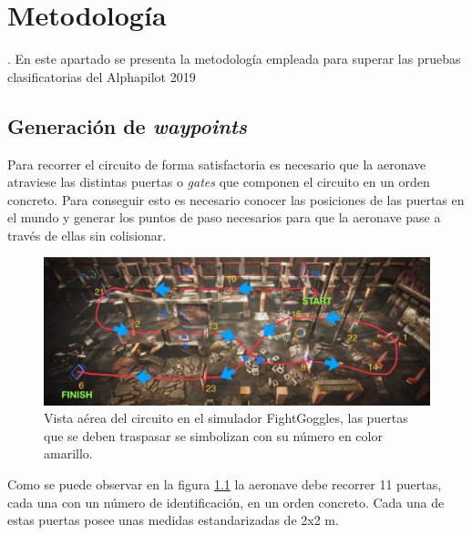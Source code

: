 \chapter{Metodología}
	
. En este apartado se presenta la metodología empleada para superar las pruebas clasificatorias del Alphapilot 2019 




\section{Generación de \textit{waypoints}}
Para recorrer el circuito de forma satisfactoria es necesario que la aeronave atraviese las distintas puertas o \textit{gates} que componen el circuito en un orden concreto. Para conseguir esto es necesario conocer las posiciones de las puertas en el mundo y generar los puntos de paso necesarios para que la aeronave pase a través de ellas sin colisionar.

\begin{figure}[htb!]
	\centering
	\includegraphics[width=\textwidth]{imagenes/diagramacircuito}
	\caption{Vista aérea del circuito en el simulador FightGoggles, las puertas que se deben traspasar se simbolizan con su número en color amarillo.}
	\label{waypoints:circuito}
\end{figure}

Como se puede observar en la figura \ref{waypoints:circuito} la aeronave debe recorrer 11 puertas, cada una con un número de identificación, en un orden concreto. Cada una de estas puertas posee unas medidas estandarizadas de 2x2 m.

